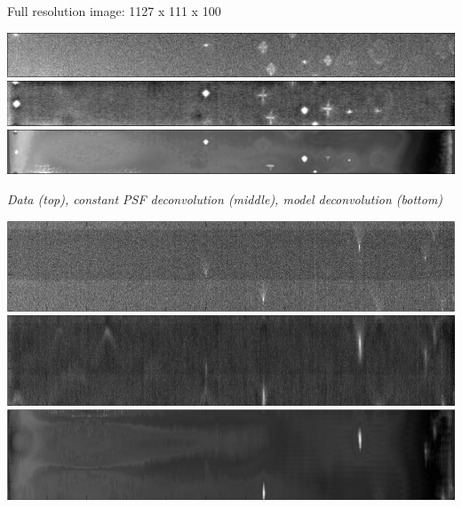\documentclass[a0paper,portrait,fontscale=0.35]{baposter}
\newcommand{\mycaption}[1]{
  {
    \smaller
    \emph{#1}
  }
}
\theoremstyle{plain}
\theoremstyle{plain}
\theoremstyle{definition}
\theoremstyle{plain}
\theoremstyle{definition}
\begin{document}
\begin{poster}
{\begin{minipage}[t]{0.51\textwidth}
    \begin{minipage}[t]{0.49\textwidth}

    Full resolution image: 1127 x 111 x 100
    \end{minipage}
    \begin{minipage}[t]{0.49\textwidth}
      \centering
      \includegraphics[width=\textwidth]{img/fBeads_xy1.png}
      \includegraphics[width=\textwidth]{img/urecBeads_h_xy1.png}
      \includegraphics[width=\textwidth]{img/urecBeads_xy1.png}

      \begin{center}
        \mycaption{
          Data (top), constant PSF deconvolution (middle),
          model deconvolution (bottom)
        }
      \end{center}

      \centering
      \includegraphics[width=\textwidth]{img/fBeads_xz1.png}
      \includegraphics[width=\textwidth]{img/urecBeads_h_xz1.png}
      \includegraphics[width=\textwidth]{img/urecBeads_xz1.png}


\end{minipage}
\end{minipage}}
\end{poster}
\end{document}
